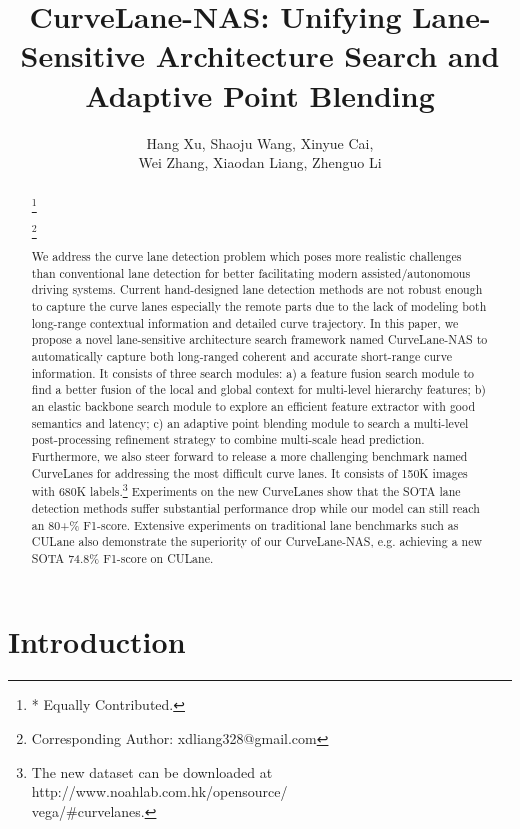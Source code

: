 \documentclass[runningheads]{llncs}
\author{Hang Xu\inst{*}\inst{1}, Shaoju Wang\inst{*}\inst{2}, Xinyue Cai\inst{1},\\ Wei Zhang\inst{1}, Xiaodan Liang\inst{\dagger}\inst{2}, Zhenguo Li\inst{1}}
\institute{Huawei Noah's Ark Lab \and
	Sun Yat-sen University}
\newcommand\blfootnote[1]{\begingroup
	\renewcommand\thefootnote{}\footnote{#1}\addtocounter{footnote}{-1}\endgroup
}
\begin{document}
\title{CurveLane-NAS: Unifying Lane-Sensitive Architecture Search and Adaptive
 Point Blending}
\maketitle
\begin{abstract}
\blfootnote{* Equally Contributed.}
\blfootnote{ Corresponding Author: xdliang328@gmail.com}
We address the curve lane detection problem which poses more realistic
challenges than conventional lane detection for better facilitating
modern assisted/autonomous driving systems. Current hand-designed
lane detection methods are not robust enough to capture the curve
lanes especially the remote parts due to the lack of modeling both
long-range contextual information and detailed curve trajectory. In
this paper, we propose a novel lane-sensitive architecture search
framework named CurveLane-NAS to automatically capture both long-ranged
coherent and accurate short-range curve information. It consists of three search modules: a) a feature
fusion search module to find a better fusion of the local and global
context for multi-level hierarchy features; b) an elastic backbone
search module to explore an efficient feature extractor with good
semantics and latency; c) an adaptive point blending module to search
a multi-level post-processing refinement strategy to combine multi-scale
head prediction. Furthermore,
we also steer forward to release a more challenging benchmark named
CurveLanes for addressing the most difficult curve lanes. It consists
of 150K images with 680K labels.\footnote{The new dataset can be downloaded at http://www.noahlab.com.hk/opensource/\\vega/\#curvelanes.} Experiments on the new CurveLanes show that the SOTA lane detection
methods suffer substantial performance drop while our model can still
reach an 80+\% F1-score. Extensive experiments on traditional lane
benchmarks such as CULane also demonstrate the superiority of our
CurveLane-NAS, e.g. achieving a new SOTA 74.8\% F1-score on CULane.

\end{abstract}



\section{Introduction}
\end{document}

